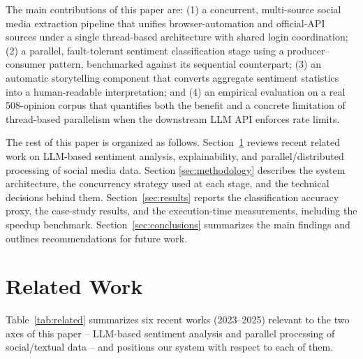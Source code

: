 \documentclass[runningheads]{llncs}
\begin{document}
The main contributions of this paper are: (1) a concurrent, multi-source
social media extraction pipeline that unifies browser-automation and
official-API sources under a single thread-based architecture with shared
login coordination; (2) a parallel, fault-tolerant sentiment classification
stage using a producer--consumer pattern, benchmarked against its sequential
counterpart; (3) an automatic storytelling component that converts aggregate
sentiment statistics into a human-readable interpretation; and (4) an
empirical evaluation on a real 508-opinion corpus that quantifies both the
benefit and a concrete limitation of thread-based parallelism when the
downstream LLM API enforces rate limits.

The rest of this paper is organized as follows. Section~\ref{sec:related}
reviews recent related work on LLM-based sentiment analysis, explainability,
and parallel/distributed processing of social media data. Section
\ref{sec:methodology} describes the system architecture, the concurrency
strategy used at each stage, and the technical decisions behind them.
Section~\ref{sec:results} reports the classification accuracy proxy, the
case-study results, and the execution-time measurements, including the
speedup benchmark. Section~\ref{sec:conclusions} summarizes the main
findings and outlines recommendations for future work.

\section{Related Work}
\label{sec:related}

Table~\ref{tab:related} summarizes six recent works (2023--2025) relevant to
the two axes of this paper -- LLM-based sentiment analysis and parallel
processing of social/textual data -- and positions our system with respect
to each of them.
\end{document}
